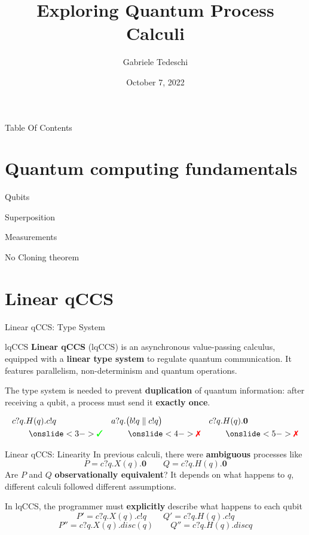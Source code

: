 \documentclass{beamer}
\title{Exploring Quantum Process Calculi}
\author{Gabriele Tedeschi}
\institute{University of Pisa}
\date{October 7, 2022}
\newcommand{\cmark}{{\color{green} \text{\ding{51}}}}%
\newcommand{\xmark}{{\color{red} \text{\ding{55}}}}%
\newcommand{\nil}{\mathbf{0}}
\begin{document}
\frame{\titlepage}

\begin{frame}{Table Of Contents}
\tableofcontents
\end{frame}

\section{Quantum computing fundamentals}
\begin{frame}{Qubits}

\end{frame}


\begin{frame}{Superposition}

\end{frame}


\begin{frame}{Measurements}

\end{frame}


\begin{frame}{No Cloning theorem}

\end{frame}


\section{Linear qCCS}
\begin{frame}{Linear qCCS: Type System}
\begin{block}{lqCCS}
\textbf{Linear qCCS} (lqCCS) is an asynchronous value-passing calculus, equipped with a \textbf{linear type system} to regulate quantum communication. It features parallelism, non-determinism and quantum operations.
\end{block}

\bigskip

\pause
The type system is needed to prevent \textbf{duplication} of quantum information: after receiving a qubit, a process must send it \textbf{exactly once}. 

\begin{align*}
& c?q.H(q).c!q  & &  a?q.\big(b!q \parallel c!q\big) \  & & c?q.H(q).\nil \  \\
& \qquad\onslide<3->{\cmark}  & & \qquad\onslide<4->{\xmark} & & \qquad\onslide<5->{\xmark}
\end{align*}

\end{frame}

\begin{frame}{Linear qCCS: Linearity}
In previous calculi, there were \textbf{ambiguous} processes like 
\[
 P = c?q.X(q).\nil \qquad Q = c?q.H(q).\nil
\]
\pause
Are $P$ and $Q$ \textbf{observationally equivalent}? It depends on what happens to $q$, different calculi followed different assumptions.

\bigskip

\pause
In lqCCS, the programmer must \textbf{explicitly} describe what happens to each qubit
\[
 P' = c?q.X(q).c!q \qquad Q' = c?q.H(q).c!q
\]
\[
 P'' = c?q.X(q).disc(q) \qquad Q'' = c?q.H(q).discq
\]
\end{frame}
\end{document}
